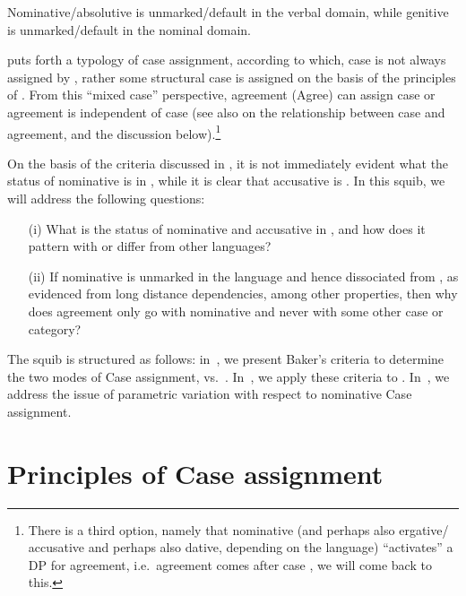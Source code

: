 \documentclass[output=paper]{langsci/langscibook}
\begin{document}
Nominative/absolutive is unmarked/default in the verbal domain, while genitive
is unmarked/default in the nominal domain.

\citet{Baker2015} puts forth a typology of case assignment, according to which,
case is not always assigned by , rather some structural case is
assigned on the basis of the principles of . From this
\enquote{mixed case} perspective, agreement (Agree) can assign case or
agreement is independent of case (see also \citealt{Baker2008} on the
relationship between case and agreement, and the discussion
below).\footnote{There is a third option, namely that nominative (and perhaps also ergative/ accusative and perhaps also dative, depending
on the language) \enquote{activates} a DP for agreement, i.e.\  agreement comes
after case \citep{Bobaljik2008}, we will come back to this.}

On the basis of the criteria discussed in \textcite{Baker2008,Baker2015}, it is
not immediately evident what the status of nominative is in , while it is
clear that accusative is . In this squib, we will address the
following questions:

\begin{itemize}

    \item[(i)] What is the status of nominative and accusative in , and
        how does it pattern with or differ from other languages?

    \item[(ii)] If nominative is unmarked in the language
        and hence dissociated from , as evidenced from long distance
        dependencies, among other properties, then why does agreement only go
        with nominative and never with some other case or
        category?

\end{itemize}

The squib is structured as follows: in~, we
present Baker’s criteria to determine the two modes of Case assignment,
 vs.\ . In~, we apply these
criteria to .  In~, we address the issue of
parametric variation with respect to nominative Case
assignment.

\section{Principles of Case assignment}\label{sec:key:13.2}
\end{document}
